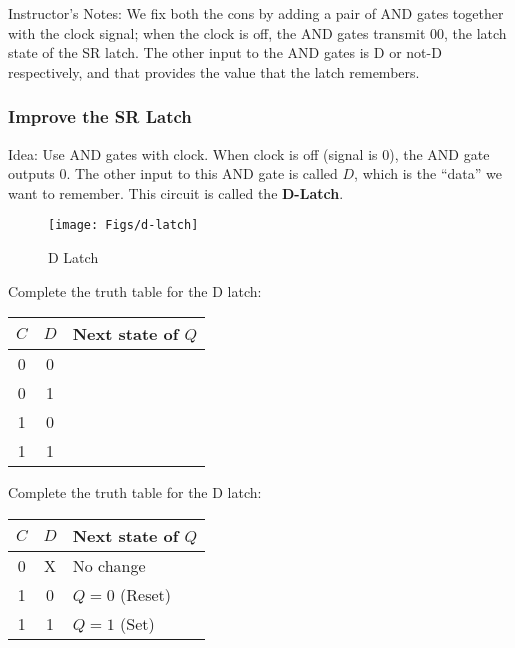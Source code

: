 \BNotes\ifnum{}
\begin{frame}[fragile]
Instructor's Notes:
We fix both the cons by adding a pair of AND gates together with the
clock signal; when the clock is off, the AND gates transmit 00, the
latch state of the SR latch. The other input to the AND gates is D or
not-D respectively, and that provides the value that the latch remembers.
\end{frame}
\fi\ENotes


\begin{frame}\frametitle{Improve the SR Latch}
Idea: Use AND gates with clock. When clock is off (signal is 0), the AND gate outputs 0. The other input to this AND gate is called $D$, which is the ``data'' we want to remember. This circuit is called the \textbf{D-Latch}.

\begin{figure}[H]
\centering
	{\texttt{[image: Figs/d-latch]}}
\caption{D Latch}
\end{figure}

\end{frame}

\begin{frame}[fragile]
\begin{tcolorbox}[enhanced,attach boxed title to top center={yshift=-3mm,yshifttext=-1mm},
  colback=blue!5!white,colframe=blue!75!black,colbacktitle=blue!80!black,
  title=Think About It,fonttitle=\bfseries,
  boxed title style={size=small,colframe=red!50!black} ]


Complete the truth table for the D latch:
		\begin{center}
		\begin{tabular}{cc|l}
		$C$ & $D$ & Next state of $Q$\\\hline
	0 & 0 & \\	
  0 & 1 & \\
		1 & 0 &\\
		1 & 1 &\\
		\end{tabular}
		\end{center}
  \end{tcolorbox}
\end{frame}

\ifnum{}
\begin{frame}[fragile]


Complete the truth table for the D latch:
		\begin{center}
		\begin{tabular}{cc|l}
		$C$ & $D$ & Next state of $Q$\\\hline
		0 & X & No change\\
		1 & 0 & $Q=0$ (Reset)\\
		1 & 1 & $Q=1$ (Set)
		\end{tabular}
		\end{center}

\end{frame}
\fi

